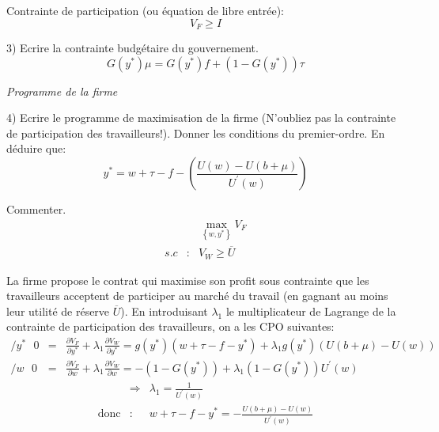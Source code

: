 \documentclass[a4paper]{article}
\begin{document}
Contrainte de participation (ou \'{e}quation de libre entr\'{e}e):%
\begin{equation*}
V_{F}\geq I
\end{equation*}

\bigskip

3) Ecrire la contrainte budg\'{e}taire du gouvernement.%
\begin{equation*}
G(y^{\ast })\mu =G(y^{\ast })f+\left( 1-G(y^{\ast })\right) \tau
\end{equation*}

\bigskip

\textit{Programme de la firme}

\bigskip

4) Ecrire le programme de maximisation de la firme (N'oubliez pas la
contrainte de participation des travailleurs!). Donner les conditions du
premier-ordre. En d\'{e}duire que:%
\begin{equation*}
y^{\ast }=w+\tau -f-\left( \frac{U(w)-U(b+\mu )}{U^{\prime }(w)}\right)
\end{equation*}

Commenter.%
\begin{eqnarray*}
&&\max_{\left\{ w,y^{\ast }\right\} }V_{F} \\
s.c &:&V_{W}\geq \overline{U}
\end{eqnarray*}

La firme propose le contrat qui maximise son profit sous contrainte que les
travailleurs acceptent de participer au march\'{e} du travail (en gagnant au
moins leur utilit\'{e} de r\'{e}serve $\overline{U}$). En introduisant $%
\lambda _{1}$ le multiplicateur de Lagrange de la contrainte de
participation des travailleurs, on a les CPO suivantes:%
\begin{eqnarray*}
/y^{\ast }\text{ \ \ \ \ \ \ \ }0 &=&\frac{\partial V_{F}}{\partial y^{\ast }%
}+\lambda _{1}\frac{\partial V_{W}}{\partial y^{\ast }}=g(y^{\ast })(w+\tau
-f-y^{\ast })+\lambda _{1}g(y^{\ast })\left( U(b+\mu )-U(w)\right)  \\
/w\text{ \ \ \ \ \ \ \ }0 &=&\frac{\partial V_{F}}{\partial w}+\lambda _{1}%
\frac{\partial V_{W}}{\partial w}=-\left( 1-G(y^{\ast })\right) +\lambda
_{1}\left( 1-G(y^{\ast })\right) U^{\prime }(w)
\end{eqnarray*}%
\begin{eqnarray*}
&\Rightarrow &\lambda _{1}=\frac{1}{U^{\prime }(w)} \\
\text{donc} &\text{:}&w+\tau -f-y^{\ast }=-\frac{U(b+\mu )-U(w)}{U^{\prime
}(w)}
\end{eqnarray*}
\end{document}
